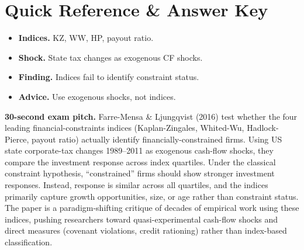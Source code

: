 \documentclass[11pt]{article}
\begin{document}
\section*{Quick Reference \& Answer Key}
\begin{answerbox}
\begin{itemize}
\item \textbf{Indices.} KZ, WW, HP, payout ratio.
\item \textbf{Shock.} State tax changes as exogenous CF shocks.
\item \textbf{Finding.} Indices fail to identify constraint status.
\item \textbf{Advice.} Use exogenous shocks, not indices.
\end{itemize}
\end{answerbox}

\begin{keybox}
\textbf{30-second exam pitch.} Farre-Mensa \& Ljungqvist (2016) test whether the four leading financial-constraints indices (Kaplan-Zingales, Whited-Wu, Hadlock-Pierce, payout ratio) actually identify financially-constrained firms. Using US state corporate-tax changes 1989--2011 as exogenous cash-flow shocks, they compare the investment response across index quartiles. Under the classical constraint hypothesis, ``constrained'' firms should show stronger investment responses. Instead, response is similar across all quartiles, and the indices primarily capture growth opportunities, size, or age rather than constraint status. The paper is a paradigm-shifting critique of decades of empirical work using these indices, pushing researchers toward quasi-experimental cash-flow shocks and direct measures (covenant violations, credit rationing) rather than index-based classification.
\end{keybox}
\end{document}
